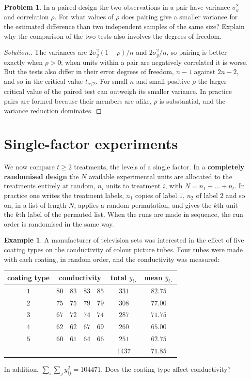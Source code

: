 \documentclass[11pt,a4paper]{article}
\numberwithin{equation}{section}
\theoremstyle{definition}
\newtheorem{exa}[thm]{Example}
\newtheorem{problemx}{Problem}[subsection]
\newenvironment{problem}{\begin{problemx}}{\end{problemx}}
\newenvironment{solution}
  {\renewcommand{\qedsymbol}{}\begin{proof}[\textit{Solution}.]}
  {\end{proof}}
\begin{document}
\begin{problem}
In a paired design the two observations in a pair have variance $\sigma_y^2$ and correlation $\rho$. For what values of $\rho$ does pairing give a smaller variance
for the estimated difference than two independent samples of the same size? Explain why the comparison of the two tests also involves the
degrees of freedom.
\end{problem}

\begin{solution}
The variances are $2\sigma_y^2(1 - \rho)/n$ and $2\sigma_y^2/n$, so pairing is better exactly when $\rho > 0$; when units within a pair are negatively correlated it
is worse. But the tests also differ in their error degrees of freedom, $n - 1$ against $2n - 2$, and so in the critical value $t_{\alpha/2}$. For small $n$ and small
positive $\rho$ the larger critical value of the paired test can outweigh its smaller variance. In practice pairs are formed because their members
are alike, $\rho$ is substantial, and the variance reduction dominates.
\end{solution}

\section{Single-factor experiments}
We now compare $t \ge 2$ treatments, the levels of a single factor. In a \textbf{completely randomised design} the $N$ available experimental
units are allocated to the treatments entirely at random, $n_i$ units to treatment $i$, with $N = n_1 + \dots + n_t$. In practice one writes the treatment
labels, $n_1$ copies of label $1$, $n_2$ of label $2$ and so on, in a list of length $N$, applies a random permutation, and gives the $k$th unit the $k$th label
of the permuted list. When the runs are made in sequence, the run order is randomised in the same way.

\begin{exa}\label{exa:coating}
A manufacturer of television sets was interested in the effect of five coating types on the conductivity of colour picture tubes. Four tubes
were made with each coating, in random order, and the conductivity was measured:
\begin{center}
\begin{tabular}{c|cccc|c|c}
coating type & \multicolumn{4}{c|}{conductivity} & total $y_{i\cdot}$ & mean $\bar y_{i\cdot}$ \\
\hline
$1$ & $80$ & $83$ & $83$ & $85$ & $331$ & $82.75$ \\
$2$ & $75$ & $75$ & $79$ & $79$ & $308$ & $77.00$ \\
$3$ & $67$ & $72$ & $74$ & $74$ & $287$ & $71.75$ \\
$4$ & $62$ & $62$ & $67$ & $69$ & $260$ & $65.00$ \\
$5$ & $60$ & $61$ & $64$ & $66$ & $251$ & $62.75$ \\
\hline
 & & & & & $1437$ & $71.85$
\end{tabular}
\end{center}
In addition, $\sum_i\sum_jy_{ij}^2 = 104471$. Does the coating type affect conductivity?
\end{exa}
\end{document}
